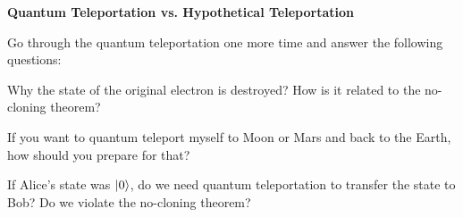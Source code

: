\documentclass[a4paper, 10pt]{article}
\begin{document}

\begin{problem}
\textbf{Quantum Teleportation vs. Hypothetical Teleportation}
\par\noindent Go through the quantum teleportation one more time and answer the following questions:
\begin{subproblems}
	\item Why the state of the original electron is destroyed? How is it related to the no-cloning theorem?
	\item If you want to quantum teleport myself to Moon or Mars and back to the Earth, how should you prepare for that?
	\item If Alice's state was \( \ket{0} \), do we need quantum teleportation to transfer the state to Bob? Do we violate the no-cloning theorem?
\end{subproblems}
\end{problem}
\end{document}
